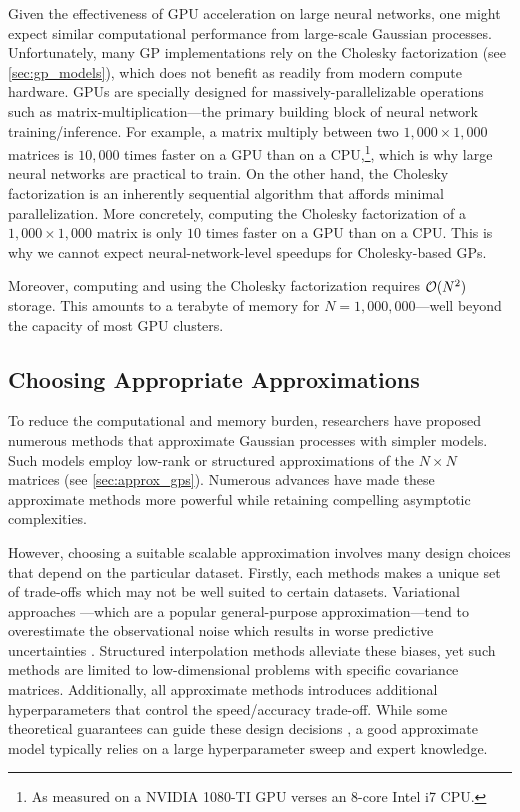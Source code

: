Given the effectiveness of GPU acceleration on large neural networks, one might expect similar computational performance from large-scale Gaussian processes.
Unfortunately, many GP implementations rely on the Cholesky factorization (see \cref{sec:gp_models}), which does not benefit as readily from modern compute hardware.
GPUs are specially designed for massively-parallelizable operations such as matrix-multiplication---the primary building block of neural network training/inference.
For example, a matrix multiply between two $1,\!000 \times 1,\!000$ matrices is $10,\!000$ times faster on a GPU than on a CPU,\footnote{
	As measured on a NVIDIA 1080-TI GPU verses an 8-core Intel i7 CPU.
}, which is why large neural networks are practical to train.
On the other hand, the Cholesky factorization is an inherently sequential algorithm that affords minimal parallelization.
More concretely, computing the Cholesky factorization of a $1,\!000 \times 1,\!000$ matrix is only $10$ times faster on a GPU than on a CPU.
This is why we cannot expect neural-network-level speedups for Cholesky-based GPs.

Moreover, computing and using the Cholesky factorization requires $\bigo{N^2}$ storage.
This amounts to a terabyte of memory for $N=1,\!000,\!000$---well beyond the capacity of most GPU clusters.

\subsection{Choosing Appropriate Approximations}
To reduce the computational and memory burden, researchers have proposed numerous methods that approximate Gaussian processes with simpler models.
Such models employ low-rank or structured approximations of the $N \times N$ matrices (see \cref{sec:approx_gps}).
Numerous advances have made these approximate methods more powerful while retaining compelling asymptotic complexities.

However, choosing a suitable scalable approximation involves many design choices that depend on the particular dataset.
Firstly, each methods makes a unique set of trade-offs which may not be well suited to certain datasets.
Variational approaches \cite{titsias2009variational}---which are a popular general-purpose approximation---tend to overestimate the observational noise which results in worse predictive uncertainties \cite{turner2011two,bauer2016understanding}.
Structured interpolation methods \cite{wilson2015kernel} alleviate these biases, yet such methods are limited to low-dimensional problems with specific covariance matrices.
Additionally, all approximate methods introduces additional hyperparameters that control the speed/accuracy trade-off.
While some theoretical guarantees can guide these design decisions \cite{wilson2015thoughts,burt2019rates}, a good approximate model typically relies on a large hyperparameter sweep and expert knowledge.



